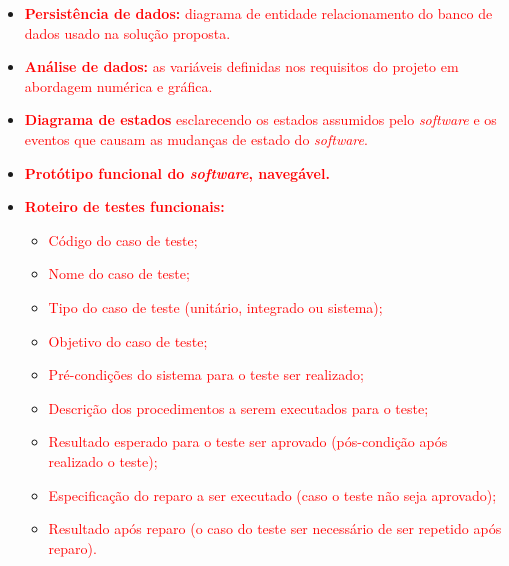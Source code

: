 \begin{itemize}
\begin{itemize}
        \item \textcolor{red}{ Estilo arquitetural contendo:}
        \begin{itemize}
            \item \textcolor{red}{ Padrão adotado: MVC, MVP, Microsserviços, Monolítico, etc (Justificar);}
            \item \textcolor{red}{ Linguagens de programação: Java, Python, C\#, JavaScript, etc.}
            \item \textcolor{red}{ \textit{Frameworks} e bibliotecas: Spring Boot, .NET Core, React, Angular, Django, etc.}
            \item \textcolor{red}{ Banco de dados: Relacional (PostgreSQL, MySQL, etc) X NãoSQL (MongoDB,etc). }
        \end{itemize}
        \item \textcolor{red}{ Diagrama de alto nível: representação esquemática dos componentes da arquitetura, suas responsabilidades e comunicações, esclarecendo a composição do \textit{front-end} e do \textit{back-end}.}
    \end{itemize}
    \item \textcolor{red}{ \textbf{Persistência de dados:} diagrama de entidade relacionamento do banco de dados usado na solução proposta.}
    \item \textcolor{red}{ \textbf{Análise de dados:} as variáveis definidas nos requisitos do projeto em abordagem numérica e gráfica.}
    \item \textcolor{red}{ \textbf{Diagrama de estados} esclarecendo os estados assumidos pelo \textit{software} e os eventos que causam as mudanças de estado do \textit{software}.}
    \item \textcolor{red}{ \textbf{Protótipo funcional do \textit{software}, navegável.}}
    \item \textcolor{red}{\textbf{ Roteiro de testes funcionais:} }
    \begin{itemize}
        \item \textcolor{red}{Código do caso de teste;}
        \item \textcolor{red}{Nome do caso de teste;}
        \item \textcolor{red}{Tipo do caso de teste (unitário, integrado ou sistema);}
        \item \textcolor{red}{ Objetivo do caso de teste;}
        \item \textcolor{red}{ Pré-condições do sistema para o teste ser realizado;}
        \item \textcolor{red}{ Descrição dos procedimentos a serem executados para o teste;}
        \item \textcolor{red}{ Resultado esperado para o teste ser aprovado (pós-condição após realizado o teste);}
        \item \textcolor{red}{ Especificação do reparo a ser executado (caso o teste não seja aprovado);}
        \item \textcolor{red}{ Resultado após reparo (o caso do teste ser necessário de ser repetido após reparo).}
    \end{itemize}
\end{itemize}


